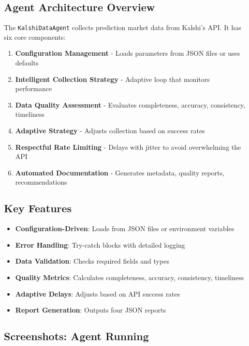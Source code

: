 \documentclass[12pt,a4paper]{article}
\begin{document}
\subsection{Agent Architecture Overview}

The \texttt{KalshiDataAgent} collects prediction market data from Kalshi's API. It has six core components:

\begin{enumerate}
  \item \textbf{Configuration Management} - Loads parameters from JSON files or uses defaults
  \item \textbf{Intelligent Collection Strategy} - Adaptive loop that monitors performance
  \item \textbf{Data Quality Assessment} - Evaluates completeness, accuracy, consistency, timeliness
  \item \textbf{Adaptive Strategy} - Adjusts collection based on success rates
  \item \textbf{Respectful Rate Limiting} - Delays with jitter to avoid overwhelming the API
  \item \textbf{Automated Documentation} - Generates metadata, quality reports, recommendations
\end{enumerate}

\subsection{Key Features}

\begin{itemize}
  \item \textbf{Configuration-Driven}: Loads from JSON files or environment variables
  \item \textbf{Error Handling}: Try-catch blocks with detailed logging
  \item \textbf{Data Validation}: Checks required fields and types
  \item \textbf{Quality Metrics}: Calculates completeness, accuracy, consistency, timeliness
  \item \textbf{Adaptive Delays}: Adjusts based on API success rates
  \item \textbf{Report Generation}: Outputs four JSON reports
\end{itemize}

\subsection{Screenshots: Agent Running}
\end{document}
